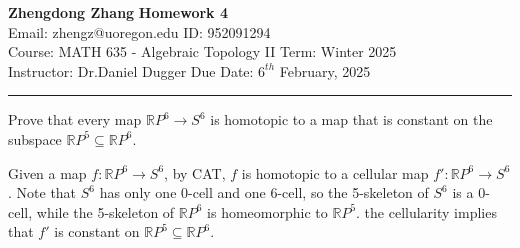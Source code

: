\documentclass[a4paper, 12pt]{article}
\begin{document}
\noindent
\large\textbf{Zhengdong Zhang} \hfill \textbf{Homework 4}   \\
Email: zhengz@uoregon.edu \hfill ID: 952091294 \\
\normalsize Course: MATH 635 - Algebraic Topology II \hfill Term: Winter 2025\\
Instructor: Dr.Daniel Dugger \hfill Due Date: $6^{th}$ February, 2025 \\
\noindent\rule{7in}{2.8pt}

\begin{problem}{1}
Prove that every map \(\mathbb{R}P^6\rightarrow S^6\) is homotopic to a map that is constant on the subspace \(\mathbb{R}P^5\subseteq \mathbb{R}P^6\).
\end{problem}
\begin{solution}
Given a map \(f:\mathbb{R}P^6\rightarrow S^6\), by CAT, \(f\) is homotopic to a cellular map \(f':\mathbb{R}P^6\rightarrow S^6\). Note that \(S^6\) has only one 0-cell and one 6-cell, so the 5-skeleton 
of \(S^6\) is a 0-cell, while the 5-skeleton of \(\mathbb{R}P^6\) is homeomorphic to \(\mathbb{R}P^5\). the cellularity implies that \(f'\) is constant on \(\mathbb{R}P^5\subseteq \mathbb{R}P^6\).
\end{solution}
\end{document}
